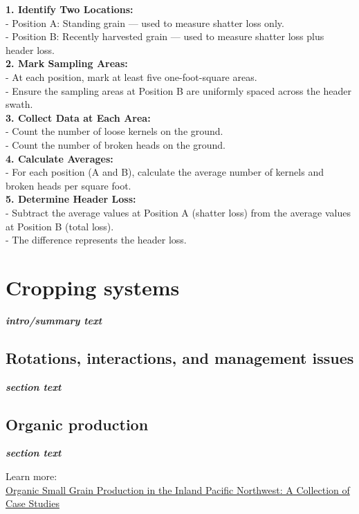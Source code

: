 \documentclass[
  letterpaper,
  DIV=11,
  numbers=noendperiod]{scrreprt}
\begin{document}
\textbf{1. Identify Two Locations:}\\
- Position A: Standing grain --- used to measure shatter loss only.\\
- Position B: Recently harvested grain --- used to measure shatter loss
plus header loss.\\
\textbf{2. Mark Sampling Areas:}\\
- At each position, mark at least five one-foot-square areas.\\
- Ensure the sampling areas at Position B are uniformly spaced across
the header swath.\\
\textbf{3. Collect Data at Each Area:}\\
- Count the number of loose kernels on the ground.\\
- Count the number of broken heads on the ground.\\
\textbf{4. Calculate Averages:}\\
- For each position (A and B), calculate the average number of kernels
and broken heads per square foot.\\
\textbf{5. Determine Header Loss:}\\
- Subtract the average values at Position A (shatter loss) from the
average values at Position B (total loss).\\
- The difference represents the header loss.


\chapter{Cropping systems}\label{cropping-systems}

\textbf{\emph{intro/summary text}}

\section{Rotations, interactions, and management
issues}\label{rotations-interactions-and-management-issues}

\textbf{\emph{section text}}

\section{Organic production}\label{organic-production}

\textbf{\emph{section text}}

Learn more:\\
\href{https://pubs.extension.wsu.edu/organic-small-grain-production-in-the-inland-pacific-northwest-a-collection-of-case-studies}{Organic
Small Grain Production in the Inland Pacific Northwest: A Collection of
Case Studies}
\end{document}
